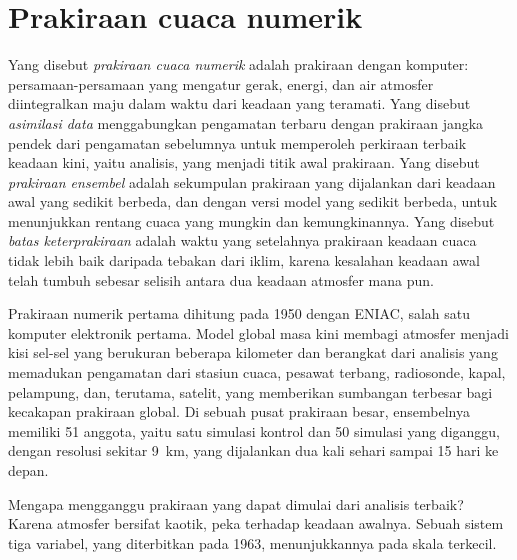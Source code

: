 \section{Prakiraan cuaca numerik}\label{sec:b2:weather-systems:nwp}

\begin{definition}\label{def:b2:weather-systems:nwp}
Yang disebut \emph{prakiraan cuaca numerik} adalah prakiraan dengan
komputer: persamaan-persamaan yang mengatur gerak, energi, dan air atmosfer
diintegralkan maju dalam waktu dari keadaan yang teramati. Yang disebut \emph{asimilasi data}
menggabungkan pengamatan terbaru dengan prakiraan jangka pendek dari pengamatan
sebelumnya untuk memperoleh perkiraan terbaik keadaan kini, yaitu analisis, yang menjadi titik awal
prakiraan. Yang disebut \emph{prakiraan ensembel} adalah sekumpulan prakiraan yang dijalankan
dari keadaan awal yang sedikit berbeda, dan dengan versi model yang sedikit berbeda, untuk
menunjukkan rentang cuaca yang mungkin dan kemungkinannya. Yang disebut \emph{batas keterprakiraan}
adalah waktu yang setelahnya prakiraan keadaan
cuaca tidak lebih baik daripada tebakan dari iklim, karena kesalahan keadaan awal telah
tumbuh sebesar selisih antara dua keadaan atmosfer mana pun.
\end{definition}

Prakiraan numerik pertama dihitung pada 1950 dengan ENIAC, salah satu komputer elektronik
pertama. Model global masa kini membagi atmosfer menjadi kisi sel-sel yang berukuran beberapa kilometer
dan berangkat dari analisis yang memadukan pengamatan dari stasiun cuaca, pesawat terbang,
radiosonde, kapal, pelampung, dan, terutama, satelit, yang memberikan sumbangan terbesar bagi
kecakapan prakiraan global. Di sebuah pusat prakiraan besar, ensembelnya
memiliki 51 anggota, yaitu satu simulasi kontrol dan 50 simulasi yang diganggu, dengan resolusi sekitar \qty{9}{km}, yang dijalankan
dua kali sehari sampai 15 hari ke depan.

Mengapa mengganggu prakiraan yang dapat dimulai dari analisis terbaik? Karena atmosfer bersifat
kaotik, peka terhadap keadaan awalnya. Sebuah sistem tiga variabel, yang diterbitkan pada 1963, menunjukkannya
pada skala terkecil.

